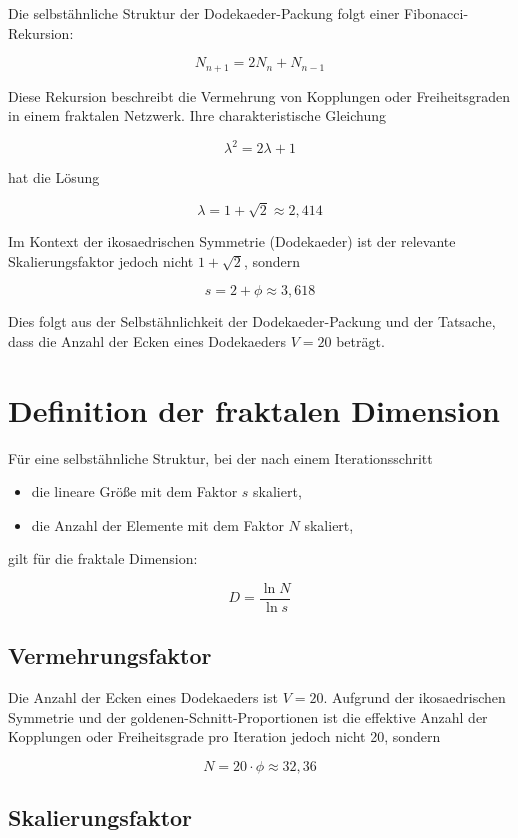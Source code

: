 Die selbstähnliche Struktur der Dodekaeder-Packung folgt einer Fibonacci-Rekursion:

\[
N_{n+1} = 2N_n + N_{n-1}
\]

Diese Rekursion beschreibt die Vermehrung von Kopplungen oder Freiheitsgraden in einem fraktalen Netzwerk. Ihre charakteristische Gleichung

\[
\lambda^2 = 2\lambda + 1
\]

hat die Lösung

\[
\lambda = 1 + \sqrt{2} \approx 2,414
\]

Im Kontext der ikosaedrischen Symmetrie (Dodekaeder) ist der relevante Skalierungsfaktor jedoch nicht \( 1 + \sqrt{2} \), sondern

\[
s = 2 + \phi \approx 3,618
\]

Dies folgt aus der Selbstähnlichkeit der Dodekaeder-Packung und der Tatsache, dass die Anzahl der Ecken eines Dodekaeders \( V = 20 \) beträgt.

\section{Definition der fraktalen Dimension}
\label{sec:d_definition}

Für eine selbstähnliche Struktur, bei der nach einem Iterationsschritt

\begin{itemize}
    \item die lineare Größe mit dem Faktor \( s \) skaliert,
    \item die Anzahl der Elemente mit dem Faktor \( N \) skaliert,
\end{itemize}

gilt für die fraktale Dimension:

\[
D = \frac{\ln N}{\ln s}
\]

\subsection{Vermehrungsfaktor}
\label{sub:vermehrungsfaktor}

Die Anzahl der Ecken eines Dodekaeders ist \( V = 20 \). Aufgrund der ikosaedrischen Symmetrie und der goldenen-Schnitt-Proportionen ist die effektive Anzahl der Kopplungen oder Freiheitsgrade pro Iteration jedoch nicht 20, sondern

\[
N = 20 \cdot \phi \approx 32,36
\]

\subsection{Skalierungsfaktor}
\label{sub:skalierungsfaktor_d}

